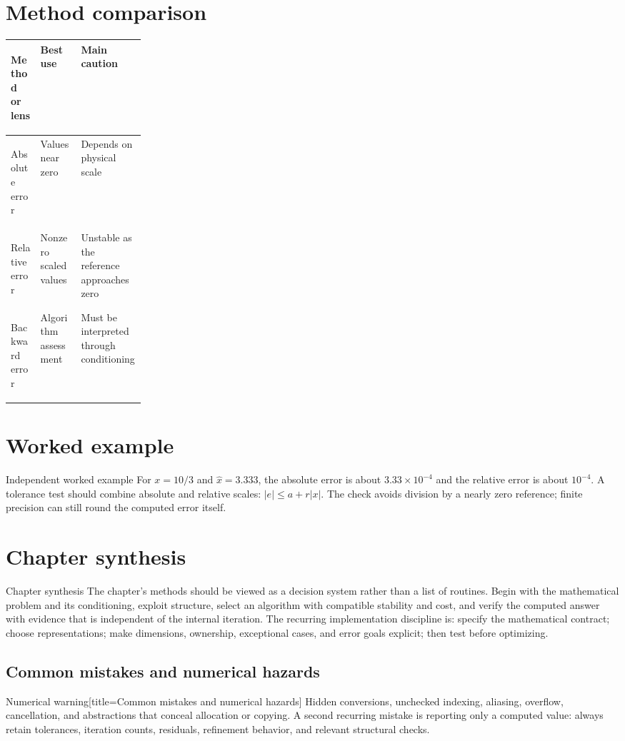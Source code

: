 \documentclass[10pt,letterpaper]{article}
\begin{document}
\section*{Method comparison}
\begin{center}
\small
\begin{tabularx}{\linewidth}{>{\bfseries\raggedright\arraybackslash}p{0.22\linewidth}XX}
\toprule
Method or lens & Best use & Main caution \\
\midrule
Absolute error & Values near zero & Depends on physical scale \\
Relative error & Nonzero scaled values & Unstable as the reference approaches zero \\
Backward error & Algorithm assessment & Must be interpreted through conditioning \\
\bottomrule
\end{tabularx}
\end{center}

\section*{Worked example}
\begin{exambox}{Independent worked example}
For $x=10/3$ and $\widehat{x}=3.333$, the absolute error is about $3.33\times10^{-4}$ and the relative error is about $10^{-4}$.  A tolerance test should combine absolute and relative scales: $|e|\leq a+r|x|$.  The check avoids division by a nearly zero reference; finite precision can still round the computed error itself.
\end{exambox}

\section*{Chapter synthesis}
\begin{summarybox}{Chapter synthesis}
The chapter's methods should be viewed as a decision system rather than a list of routines.  Begin with the mathematical problem and its conditioning, exploit structure, select an algorithm with compatible stability and cost, and verify the computed answer with evidence that is independent of the internal iteration.  The recurring implementation discipline is: specify the mathematical contract; choose representations; make dimensions, ownership, exceptional cases, and error goals explicit; then test before optimizing.
\end{summarybox}

\subsection*{Common mistakes and numerical hazards}
\begin{warnbox}{Numerical warning}[title={Common mistakes and numerical hazards}]
Hidden conversions, unchecked indexing, aliasing, overflow, cancellation, and abstractions that conceal allocation or copying.  A second recurring mistake is reporting only a computed value: always retain tolerances, iteration counts, residuals, refinement behavior, and relevant structural checks.
\end{warnbox}
\end{document}
